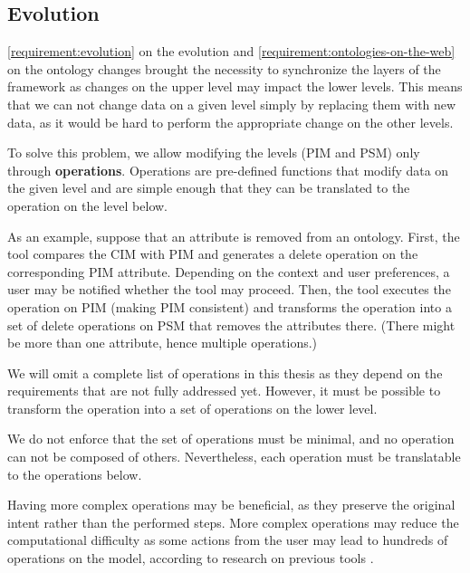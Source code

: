 \subsection{Evolution}

\autoref{requirement:evolution} on the evolution and \autoref{requirement:ontologies-on-the-web} on the ontology changes brought the necessity to synchronize the layers of the framework as changes on the upper level may impact the lower levels. This means that we can not change data on a given level simply by replacing them with new data, as it would be hard to perform the appropriate change on the other levels.

To solve this problem, we allow modifying the levels (PIM and PSM) only through \textbf{operations}. Operations are pre-defined functions that modify data on the given level and are simple enough that they can be translated to the operation on the level below.

As an example, suppose that an attribute is removed from an ontology. First, the tool compares the CIM with PIM and generates a delete operation on the corresponding PIM attribute. Depending on the context and user preferences, a user may be notified whether the tool may proceed. Then, the tool executes the operation on PIM (making PIM consistent) and transforms the operation into a set of delete operations on PSM that removes the attributes there. (There might be more than one attribute, hence multiple operations.)

We will omit a complete list of operations in this thesis as they depend on the requirements that are not fully addressed yet. However, it must be possible to transform the operation into a set of operations on the lower level.

We do not enforce that the set of operations must be minimal, and no operation can not be composed of others. Nevertheless, each operation must be translatable to the operations below.

Having more complex operations may be beneficial, as they preserve the original intent rather than the performed steps. More complex operations may reduce the computational difficulty as some actions from the user may lead to hundreds of operations on the model, according to research on previous tools \cite{nevcasky2012evolution}.


